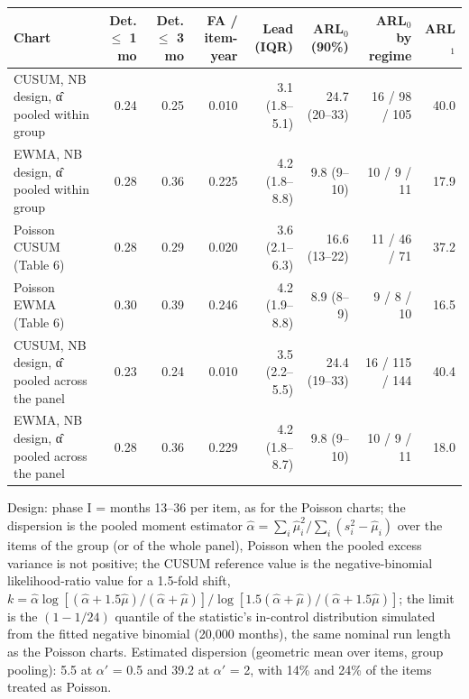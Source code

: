 \noindent\begin{minipage}{\linewidth}
\label{tab:S14}
\centering\scriptsize
\begin{tabular}{lrrrrrrr}
\toprule
Chart & Det. $\le$ 1 mo & Det. $\le$ 3 mo & FA / item-year & Lead (IQR) & ARL$_0$ (90\%) & ARL$_0$ by regime & ARL$_1$ \\ \midrule
CUSUM, NB design, α̂ pooled within group & 0.24 & 0.25 & 0.010 & 3.1 (1.8–5.1) & 24.7 (20–33) & 16 / 98 / 105 & 40.0 \\
EWMA, NB design, α̂ pooled within group & 0.28 & 0.36 & 0.225 & 4.2 (1.8–8.8) & 9.8 (9–10) & 10 / 9 / 11 & 17.9 \\
Poisson CUSUM (Table 6) & 0.28 & 0.29 & 0.020 & 3.6 (2.1–6.3) & 16.6 (13–22) & 11 / 46 / 71 & 37.2 \\
Poisson EWMA (Table 6) & 0.30 & 0.39 & 0.246 & 4.2 (1.9–8.8) & 8.9 (8–9) & 9 / 8 / 10 & 16.5 \\
CUSUM, NB design, α̂ pooled across the panel & 0.23 & 0.24 & 0.010 & 3.5 (2.2–5.5) & 24.4 (19–33) & 16 / 115 / 144 & 40.4 \\
EWMA, NB design, α̂ pooled across the panel & 0.28 & 0.36 & 0.229 & 4.2 (1.8–8.7) & 9.8 (9–10) & 10 / 9 / 11 & 18.0 \\
\bottomrule
\end{tabular}
\par\vspace{3pt}\begin{flushleft}\footnotesize Design: phase I = months 13--36 per item, as for the Poisson charts; the dispersion is the pooled moment estimator $\hat{\alpha} = \sum_i \hat{\mu}_i^2 / \sum_i (s_i^2 - \hat{\mu}_i)$ over the items of the group (or of the whole panel), Poisson when the pooled excess variance is not positive; the CUSUM reference value is the negative-binomial likelihood-ratio value for a 1.5-fold shift, $k = \hat{\alpha}\log[(\hat{\alpha} + 1.5\hat{\mu})/(\hat{\alpha} + \hat{\mu})] / \log[1.5(\hat{\alpha} + \hat{\mu})/(\hat{\alpha} + 1.5\hat{\mu})]$; the limit is the $(1 - 1/24)$ quantile of the statistic's in-control distribution simulated from the fitted negative binomial (20,000 months), the same nominal run length as the Poisson charts. Estimated dispersion (geometric mean over items, group pooling): 5.5 at $\alpha'$ = 0.5 and 39.2 at $\alpha'$ = 2, with 14\% and 24\% of the items treated as Poisson.\end{flushleft}
\end{minipage}
\vspace{22pt}


